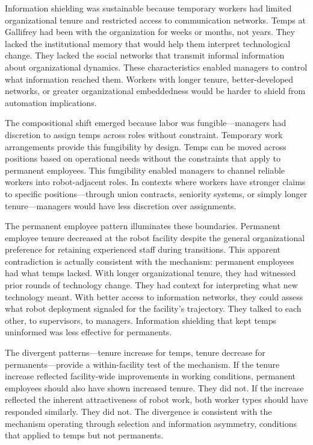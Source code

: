 \documentclass[12pt]{article}
\begin{document}
Information shielding was sustainable because temporary workers had limited organizational tenure and restricted access to communication networks. Temps at Gallifrey had been with the organization for weeks or months, not years. They lacked the institutional memory that would help them interpret technological change. They lacked the social networks that transmit informal information about organizational dynamics. These characteristics enabled managers to control what information reached them. Workers with longer tenure, better-developed networks, or greater organizational embeddedness would be harder to shield from automation implications.

The compositional shift emerged because labor was fungible---managers had discretion to assign temps across roles without constraint. Temporary work arrangements provide this fungibility by design. Temps can be moved across positions based on operational needs without the constraints that apply to permanent employees. This fungibility enabled managers to channel reliable workers into robot-adjacent roles. In contexts where workers have stronger claims to specific positions---through union contracts, seniority systems, or simply longer tenure---managers would have less discretion over assignments.

The permanent employee pattern illuminates these boundaries. Permanent employee tenure decreased at the robot facility despite the general organizational preference for retaining experienced staff during transitions. This apparent contradiction is actually consistent with the mechanism: permanent employees had what temps lacked. With longer organizational tenure, they had witnessed prior rounds of technology change. They had context for interpreting what new technology meant. With better access to information networks, they could assess what robot deployment signaled for the facility's trajectory. They talked to each other, to supervisors, to managers. Information shielding that kept temps uninformed was less effective for permanents.

The divergent patterns---tenure increase for temps, tenure decrease for permanents---provide a within-facility test of the mechanism. If the tenure increase reflected facility-wide improvements in working conditions, permanent employees should also have shown increased tenure. They did not. If the increase reflected the inherent attractiveness of robot work, both worker types should have responded similarly. They did not. The divergence is consistent with the mechanism operating through selection and information asymmetry, conditions that applied to temps but not permanents.
\end{document}
